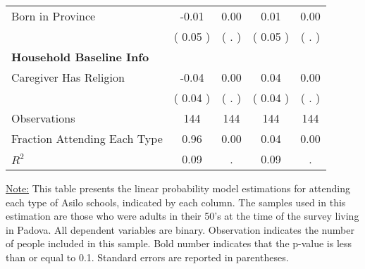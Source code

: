 \begin{table}[H]
{\begin{tabular}{lcccc}
\quad Born in Province &     -0.01 &      0.00 &      0.01 &      0.00 \\
\quad  & (     0.05 ) & (        . )  & (     0.05 )  & (        . )  \\
\midrule
\textbf{Household Baseline Info} \\
\quad Caregiver Has Religion &     -0.04 &      0.00 &      0.04 &      0.00 \\
\quad  & (     0.04 ) & (        . )  & (     0.04 )  & (        . )  \\
\midrule
Observations & 144 & 144 & 144 & 144 \\
Fraction Attending Each Type &      0.96 &      0.00 &      0.04 &      0.00 \\
\midrule
$ R^2$ &      0.09 &         . &      0.09 &         . \\
\bottomrule
\end{tabular}}
\end{table}
\begin{scriptsize}
\noindent\underline{Note:} This table presents the linear probability model estimations for attending each type of Asilo schools, indicated by each column. The samples used in this estimation are those who were adults in their 50's at the time of the survey living in Padova. All dependent variables are binary. Observation indicates the number of people included in this sample. Bold number indicates that the p-value is less than or equal to 0.1. Standard errors are reported in parentheses.
\end{scriptsize}
